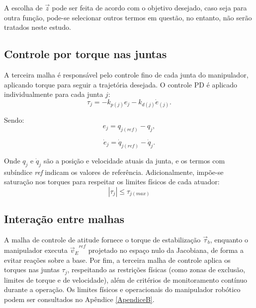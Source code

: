 A escolha de $ \vec{z} $ pode ser feita de acordo com o objetivo desejado, caso seja para outra função, pode-se selecionar outros termos em questão, no entanto, não serão tratados neste estudo.

\subsection{Controle por torque nas juntas}
A terceira malha é responsável pelo controle fino de cada junta do manipulador, aplicando torque para seguir a trajetória desejada. O controle PD é aplicado individualmente para cada junta $ j $:
\begin{equation}
\tau_j = -k_{p(j)} e_j - k_{d(j)} \dot{e}_(j).
\label{eq:controle_PD_junta}
\end{equation}

Sendo:
\begin{equation}
e_j = q_{j(ref)} - q_j,
\label{eq:erro_PD_junta1}
\end{equation}

\begin{equation}
\dot{e}_j = \dot{q}_{j(ref)} - \dot{q}_j.
\label{eq:erro_PD_junta2}
\end{equation}

Onde $ q_j $ e $ \dot{q}_j $ são a posição e velocidade atuais da junta, e os termos com subíndice \emph{ref} indicam os valores de referência.
Adicionalmente, impõe-se saturação nos torques para respeitar os limites físicos de cada atuador:
\begin{equation}
|\tau_j| \leq \tau_{j(max)}
\label{eq:saturacao_torque_junta}
\end{equation}


\subsection{Interação entre malhas}
A malha de controle de atitude fornece o torque de estabilização $ \vec{\tau}_b $, enquanto o manipulador executa $ {\vec{v}_E}^{ref} $ projetado no espaço nulo da Jacobiana, de forma a evitar reações sobre a base.
Por fim, a terceira malha de controle aplica os torques nas juntas $ \tau_j $, respeitando as restrições físicas (como zonas de exclusão, limites de torque e de velocidade), além de critérios de monitoramento contínuo durante a operação.
Os limites físicos e operacionais do manipulador robótico podem ser consultados no Apêndice \ref{ApendiceB}.

